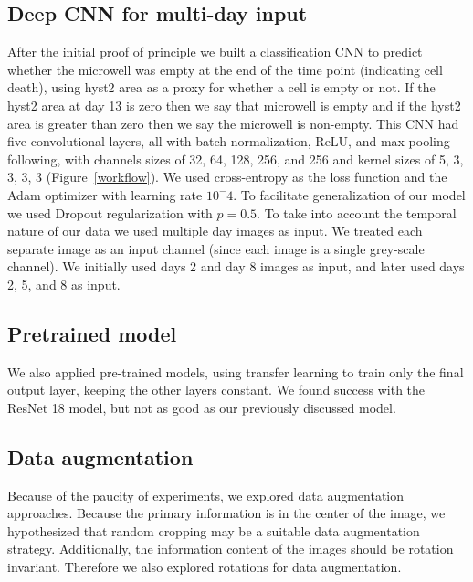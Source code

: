 \documentclass[10pt,twocolumn,letterpaper]{article}
\begin{document}
\subsection{Deep CNN for multi-day input}
\label{multidayCNN}

After the initial proof of principle we built a classification CNN to predict whether the microwell was empty at the end of the time point (indicating cell death), using hyst2 area as a proxy for whether a cell is empty or not.  If the hyst2 area at day 13 is zero then we say that microwell is empty and if the hyst2 area is greater than zero then we say the microwell is non-empty.  This CNN had five convolutional layers, all with batch normalization, ReLU, and max pooling following, with channels sizes of 32, 64, 128, 256, and 256 and kernel sizes of 5, 3, 3, 3, 3 (Figure~\ref{workflow}).  We used cross-entropy as the loss function and the Adam optimizer with learning rate $10^-4$.   To facilitate generalization of our model we used Dropout regularization with $p = 0.5$.  To take into account the temporal nature of our data we used multiple day images as input.  We treated each separate image as an input channel (since each image is a single grey-scale channel).  We initially used days 2 and day 8 images as input, and later used days 2, 5, and 8 as input.


\subsection{Pretrained model}

We also applied pre-trained models, using transfer learning to train only the final output layer, keeping the other layers constant.  We found success with the ResNet 18 model, but not as good as our previously discussed model.

\subsection{Data augmentation}

Because of the paucity of experiments, we explored data augmentation approaches.  Because the primary information is in the center of the image, we hypothesized that random cropping may be a suitable data augmentation strategy.  Additionally, the information content of the images should be rotation invariant.   Therefore we also explored rotations for data augmentation.


\end{document}
